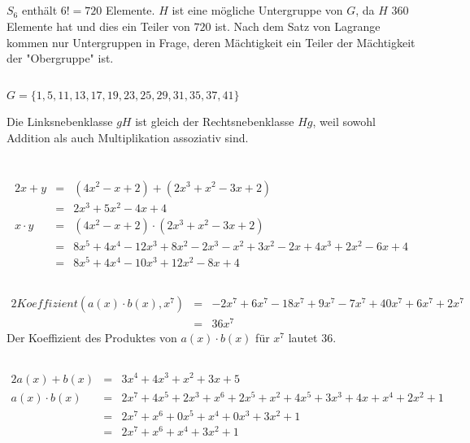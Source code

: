 \documentclass[10pt,a4paper,oneside,ngerman,numbers=noenddot]{scrartcl}
\begin{document}
\subsection{} %
$S_{6}$ enthält $6! = 720$ Elemente. $H$ ist eine mögliche Untergruppe von $G$, da $H$ $360$ Elemente hat und dies ein Teiler von $720$ ist. Nach dem Satz von Lagrange kommen nur Untergruppen in Frage, deren Mächtigkeit ein Teiler der Mächtigkeit der "Obergruppe" ist.
\subsection{} %
$G = \{1,5,11,13,17,19,23,25,29,31,35,37,41\}$

Die Linksnebenklasse $gH$ ist gleich der Rechtsnebenklasse $Hg$, weil sowohl Addition als auch Multiplikation assoziativ sind.
\section{} %
\subsection{} %
\begin{alignat*}{2}
x + y &=& (4x^{2} - x + 2) + (2x^{3} + x^{2} - 3x + 2) \\
&=& 2x^{3} + 5x^{2} - 4x + 4 \\
x \cdot y &=& (4x^{2} - x + 2) \cdot (2x^{3} + x^{2} - 3x + 2) \\
&=& 8x^{5} + 4x^{4} - 12x^{3} + 8x^{2} - 2x^{3} -x^{2} + 3x^{2} -2x + 4x^{3} + 2x^{2} -6x + 4 \\
&=& 8x^{5} + 4x^{4} - 10x^{3} + 12x^{2} - 8x +4
\end{alignat*}
\subsection{} %
\begin{alignat*}{2}
Koeffizient(a(x) \cdot b(x),x^{7}) &=& -2x^{7} + 6x^{7} - 18x^{7} + 9x^{7} - 7x^{7} + 40x^{7} + 6x^{7} + 2x^{7} \\
&=& 36x^{7}
\end{alignat*}
Der Koeffizient des Produktes von $a(x) \cdot b(x)$ für $x^{7}$ lautet $36$.
\subsection{} %
\begin{alignat*}{2}
a(x) + b(x) &=& 3x^{4} + 4x^{3} + x^{2} + 3x + 5 \\
a(x) \cdot b(x) &=& 2x^{7} + 4x^{5} + 2x^{3} + x^{6} + 2x^{5} + x^{2} + 4x^{5} + 3x^{3} + 4x + x^{4} + 2x^{2} + 1 \\
&=& 2x^{7} + x^{6} + 0x^{5} + x^{4} + 0x^{3} + 3x^{2} + 1 \\
&=& 2x^{7} + x^{6} + x^{4} + 3x^{2} + 1
\end{alignat*}
\end{document}
